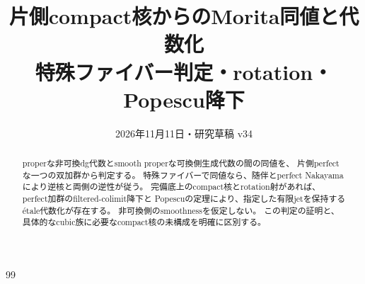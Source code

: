 \documentclass[a4paper,11pt]{ltjsarticle}
\title{片側compact核からのMorita同値と代数化\\
\large 特殊ファイバー判定・rotation・Popescu降下}
\author{}\date{2026年11月11日・研究草稿 v34}
\theoremstyle{remark}\newtheorem{remark}[theorem]{注意}
\begin{document}
\maketitle
\begin{abstract}
properな非可換dg代数とsmooth properな可換側生成代数の間の同値を、
片側perfectな一つの双加群から判定する。
特殊ファイバーで同値なら、随伴とperfect Nakayamaにより逆核と両側の逆性が従う。
完備底上のcompact核とrotation射があれば、perfect加群のfiltered-colimit降下と
Popescuの定理により、指定した有限jetを保持する\'etale代数化が存在する。
非可換側のsmoothnessを仮定しない。
この判定の証明と、具体的なcubic族に必要なcompact核の未構成を明確に区別する。
\end{abstract}

\begin{thebibliography}{99}

\end{thebibliography}
\end{document}
